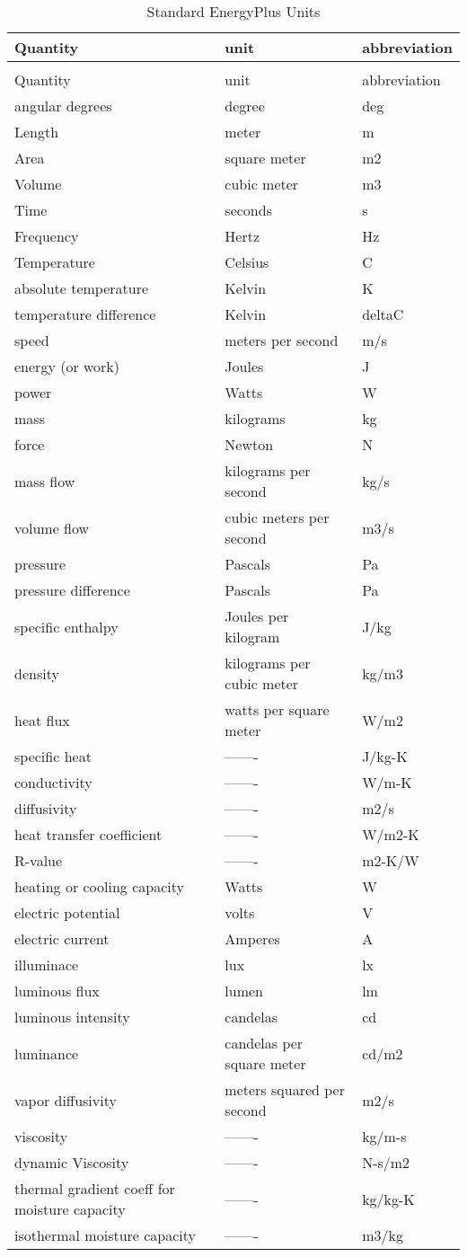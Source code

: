 \begin{longtable}[c]{p{1.59in}p{2.9in}p{1.5in}}
\caption{Standard EnergyPlus Units \label{table:standard-energyplus-units}} \tabularnewline
\toprule 
Quantity & unit & abbreviation \tabularnewline
\midrule
\endfirsthead

\caption[]{Standard EnergyPlus Units} \tabularnewline
\toprule 
Quantity & unit & abbreviation \tabularnewline
\midrule
\endhead

angular degrees & degree & deg \tabularnewline
Length & meter & m \tabularnewline
Area & square meter & m2 \tabularnewline
Volume & cubic meter & m3 \tabularnewline
Time & seconds & s \tabularnewline
Frequency & Hertz & Hz \tabularnewline
Temperature & Celsius & C \tabularnewline
absolute temperature & Kelvin & K \tabularnewline
temperature difference & Kelvin & deltaC \tabularnewline
speed & meters per second & m/s \tabularnewline
energy (or work) & Joules & J \tabularnewline
power & Watts & W \tabularnewline
mass & kilograms & kg \tabularnewline
force & Newton & N \tabularnewline
mass flow & kilograms per second & kg/s \tabularnewline
volume flow & cubic meters per second & m3/s \tabularnewline
pressure & Pascals & Pa \tabularnewline
pressure difference & Pascals & Pa \tabularnewline
specific enthalpy & Joules per kilogram & J/kg \tabularnewline
density & kilograms per cubic meter & kg/m3 \tabularnewline
heat flux & watts per square meter & W/m2 \tabularnewline
specific heat & ------- & J/kg-K \tabularnewline
conductivity & ------- & W/m-K \tabularnewline
diffusivity & ------- & m2/s \tabularnewline
heat transfer coefficient & ------- & W/m2-K \tabularnewline
R-value & ------- & m2-K/W \tabularnewline
heating or cooling capacity & Watts & W \tabularnewline
electric potential & volts & V \tabularnewline
electric current & Amperes & A \tabularnewline
illuminace & lux & lx \tabularnewline
luminous flux & lumen & lm \tabularnewline
luminous intensity & candelas & cd \tabularnewline
luminance & candelas per square meter & cd/m2 \tabularnewline
vapor diffusivity & meters squared per second & m2/s \tabularnewline
viscosity & ------- & kg/m-s \tabularnewline
dynamic Viscosity & ------- & N-s/m2 \tabularnewline
thermal gradient coeff for moisture capacity & ------- & kg/kg-K \tabularnewline
isothermal moisture capacity & ------- & m3/kg \tabularnewline
\bottomrule
\end{longtable}
